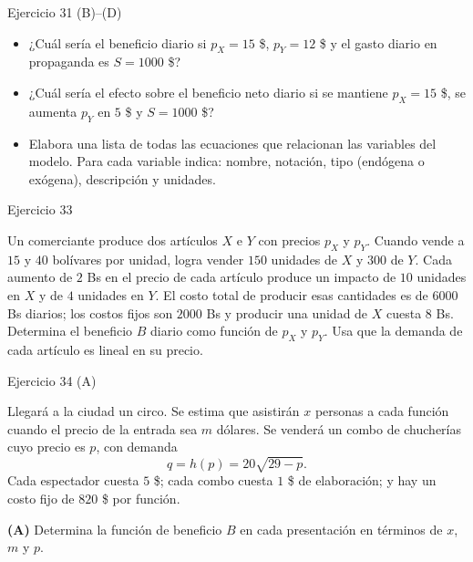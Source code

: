 \documentclass[aspectratio=169]{beamer}
\begin{document}
\begin{frame}{Ejercicio 31 (B)–(D)}
  \begin{mwejercicio}
    \begin{itemize}
      \item[\textbf{(B)}] ¿Cuál sería el beneficio diario si \(p_X=15\) \$,
      \(p_Y=12\) \$ y el gasto diario en propaganda es \(S=1000\) \$?
      \item[\textbf{(C)}] ¿Cuál sería el efecto sobre el beneficio neto diario
      si se mantiene \(p_X=15\) \$, se aumenta \(p_Y\) en \(5\) \$ y
      \(S=1000\) \$?
      \item[\textbf{(D)}] Elabora una lista de todas las ecuaciones que
      relacionan las variables del modelo. Para cada variable indica: nombre,
      notación, tipo (endógena o exógena), descripción y unidades.
    \end{itemize}
  \end{mwejercicio}
\end{frame}

\begin{frame}{Ejercicio 33}
  \begin{mwejercicio}
    Un comerciante produce dos artículos \(X\) e \(Y\) con precios \(p_X\) y
    \(p_Y\). Cuando vende a \(15\) y \(40\) bolívares por unidad, logra vender
    \(150\) unidades de \(X\) y \(300\) de \(Y\). Cada aumento de \(2\) Bs en el
    precio de cada artículo produce un impacto de \(10\) unidades en \(X\) y de
    \(4\) unidades en \(Y\). El costo total de producir esas cantidades es de
    \(6000\) Bs diarios; los costos fijos son \(2000\) Bs y producir una unidad
    de \(X\) cuesta \(8\) Bs. Determina el beneficio \(B\) diario como función de
    \(p_X\) y \(p_Y\). Usa que la demanda de cada artículo es lineal en su precio.
  \end{mwejercicio}
\end{frame}

\begin{frame}{Ejercicio 34 (A)}
  \begin{mwejercicio}
    Llegará a la ciudad un circo. Se estima que asistirán \(x\) personas a cada
    función cuando el precio de la entrada sea \(m\) dólares. Se venderá un
    combo de chucherías cuyo precio es \(p\), con demanda
    \[
      q=h(p)=20\sqrt{29-p}.
    \]
    Cada espectador cuesta \(5\) \$; cada combo cuesta \(1\) \$ de elaboración;
    y hay un costo fijo de \(820\) \$ por función.

    \textbf{(A)} Determina la función de beneficio \(B\) en cada presentación en
    términos de \(x\), \(m\) y \(p\).
  \end{mwejercicio}
\end{frame}
\end{document}
